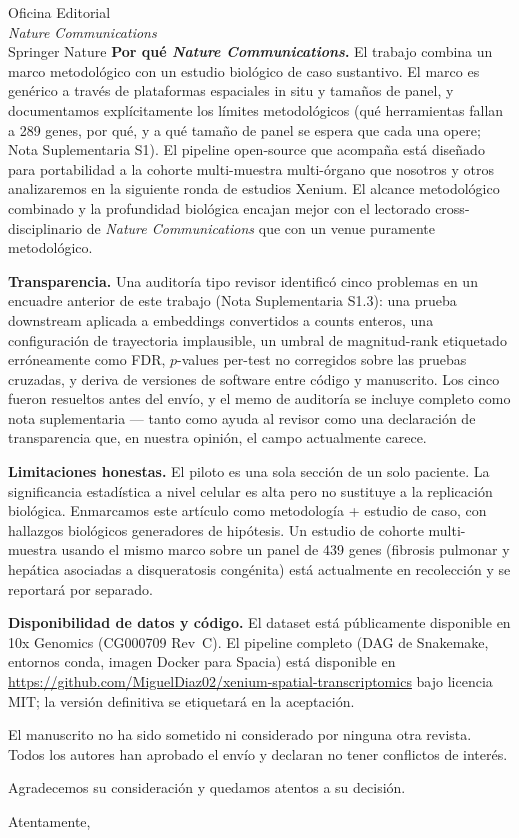 \documentclass[11pt,a4paper]{letter}
\begin{document}
\begin{letter}{Oficina Editorial\\\textit{Nature Communications}\\Springer Nature}
\textbf{Por qué \textit{Nature Communications}.} El trabajo combina un marco metodológico con un estudio biológico de caso sustantivo. El marco es genérico a través de plataformas espaciales in situ y tamaños de panel, y documentamos explícitamente los límites metodológicos (qué herramientas fallan a 289 genes, por qué, y a qué tamaño de panel se espera que cada una opere; Nota Suplementaria S1). El pipeline open-source que acompaña está diseñado para portabilidad a la cohorte multi-muestra multi-órgano que nosotros y otros analizaremos en la siguiente ronda de estudios Xenium. El alcance metodológico combinado y la profundidad biológica encajan mejor con el lectorado cross-disciplinario de \textit{Nature Communications} que con un venue puramente metodológico.

\textbf{Transparencia.} Una auditoría tipo revisor identificó cinco problemas en un encuadre anterior de este trabajo (Nota Suplementaria S1.3): una prueba downstream aplicada a embeddings convertidos a counts enteros, una configuración de trayectoria implausible, un umbral de magnitud-rank etiquetado erróneamente como FDR, $p$-values per-test no corregidos sobre las pruebas cruzadas, y deriva de versiones de software entre código y manuscrito. Los cinco fueron resueltos antes del envío, y el memo de auditoría se incluye completo como nota suplementaria --- tanto como ayuda al revisor como una declaración de transparencia que, en nuestra opinión, el campo actualmente carece.

\textbf{Limitaciones honestas.} El piloto es una sola sección de un solo paciente. La significancia estadística a nivel celular es alta pero no sustituye a la replicación biológica. Enmarcamos este artículo como metodología + estudio de caso, con hallazgos biológicos generadores de hipótesis. Un estudio de cohorte multi-muestra usando el mismo marco sobre un panel de 439 genes (fibrosis pulmonar y hepática asociadas a disqueratosis congénita) está actualmente en recolección y se reportará por separado.

\textbf{Disponibilidad de datos y código.} El dataset está públicamente disponible en 10x Genomics (CG000709 Rev~C). El pipeline completo (DAG de Snakemake, entornos conda, imagen Docker para Spacia) está disponible en \url{https://github.com/MiguelDiaz02/xenium-spatial-transcriptomics} bajo licencia MIT; la versión definitiva se etiquetará en la aceptación.

El manuscrito no ha sido sometido ni considerado por ninguna otra revista. Todos los autores han aprobado el envío y declaran no tener conflictos de interés.

Agradecemos su consideración y quedamos atentos a su decisión.

\closing{Atentamente,}

\end{letter}
\end{document}
